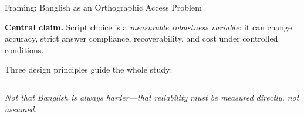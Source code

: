 \documentclass[aspectratio=169,10pt]{beamer}
\begin{document}
\begin{frame}{Framing: Banglish as an Orthographic Access Problem}
\begin{keybox}
\normalsize\textbf{Central claim.} Script choice is a \emph{measurable robustness variable}: it can change accuracy, strict answer compliance, recoverability, and cost under controlled conditions.
\end{keybox}
\vspace{0.35cm}
\small Three design principles guide the whole study:
\vspace{0.15cm}

\begin{columns}[T]
\end{columns}
\vspace{0.2cm}
\centering\footnotesize\itshape\color{subink}
Not that Banglish is always harder—that reliability must be \emph{measured directly}, not assumed.
\end{frame}
\end{document}
